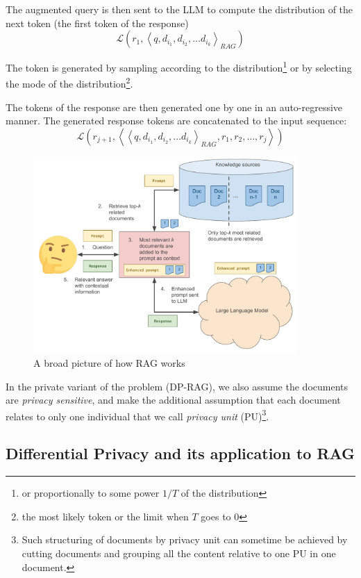 \documentclass[
  12pt,
  a4paper,
]{article}
\begin{document}
The augmented query is then sent to the LLM to compute the distribution
of the next token (the first token of the response)
\[\mathcal{L}\left(r_1, \left<q, d_{i_1}, d_{i_2}, \ldots d_{i_k}\right>_{RAG}\right)\]

The token is generated by sampling according to the
distribution\footnote{or proportionally to some power \(1/T\) of the
  distribution} or by selecting the mode of the distribution\footnote{the
  most likely token or the limit when \(T\) goes to \(0\)}.

The tokens of the response are then generated one by one in an
auto-regressive manner. The generated response tokens are concatenated
to the input sequence:
\[\mathcal{L}\left(r_{j+1}, \left<\left<q, d_{i_1}, d_{i_2}, \ldots d_{i_k}\right>_{RAG}, r_1, r_2,\ldots, r_j\right>\right)\]

\begin{figure}
\centering
\includegraphics[width=100mm,height=\textheight,keepaspectratio]{figures/noDP-RAG.pdf}
\caption{A broad picture of how RAG works}\label{fig:rag}
\end{figure}

In the private variant of the problem (DP-RAG), we also assume the
documents are \emph{privacy sensitive}, and make the additional
assumption that each document relates to only one individual that we
call \emph{privacy unit} (PU)\footnote{Such structuring of documents by
  privacy unit can sometime be achieved by cutting documents and
  grouping all the content relative to one PU in one document.}.

\subsection{Differential Privacy and its application to
RAG}\label{differential-privacy-and-its-application-to-rag}
\end{document}

